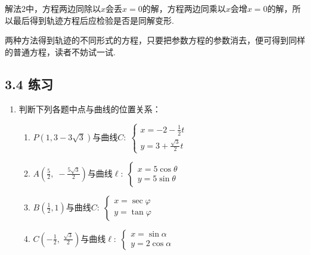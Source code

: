 \begin{remark}
     解法2中，方程两边同除以$x$会丢$x=0$的解，方程两边同乘以$x$会增$x=0$的解，所以最后得到轨迹方程后应检验是否是同解变形.

     两种方法得到轨迹的不同形式的方程，只要把参数方程的参数消去，便可得到同样的普通方程，读者不妨试一试.
\end{remark}

\subsection*{3.4 练习}
\begin{enumerate}
    \item 判断下列各题中点与曲线的位置关系：
\begin{enumerate}[(1)]
    \item $P\left(1,3-3\sqrt{3}\right)$与曲线$C:\; \begin{cases}
        x=-2-\frac{1}{2}t\\[1.5ex] y=3+\frac{\sqrt{3}}{2}t
    \end{cases}$
    \item $A\left(\frac{5}{2},\; -\frac{5\sqrt{3}}{2}\right)$与曲线$\ell:\; \begin{cases}
        x=5\cos\theta\\ y=5\sin\theta
    \end{cases}$
    \item $B\left(\frac{1}{2},1\right)$与曲线$C:\; \begin{cases}
        x=\sec\varphi \\ y=\tan\varphi
    \end{cases}$
    \item $C\left(-\frac{1}{2},\; \frac{\sqrt{3}}{2}\right)$与曲线$\ell:\; \begin{cases}
        x=\sin\alpha \\  y=2\cos\alpha
    \end{cases}$
\end{enumerate}


\end{enumerate}
